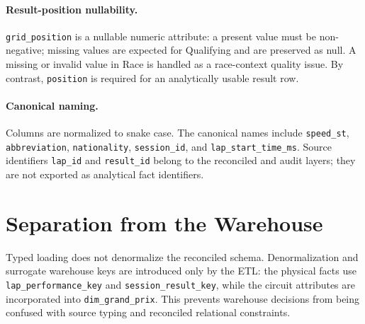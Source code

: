 \documentclass[a4paper,11pt]{article}
\begin{document}
	\paragraph{Result-position nullability.}
	\texttt{grid\_position} is a nullable numeric attribute: a present value must be
	non-negative; missing values are expected for Qualifying and are preserved as null.
	A missing or invalid value in Race is handled as a race-context quality issue.
	By contrast, \texttt{position} is required for an analytically usable result row.

	\paragraph{Canonical naming.}
	Columns are normalized to snake case. The canonical names include
	\texttt{speed\_st}, \texttt{abbreviation}, \texttt{nationality},
	\texttt{session\_id}, and \texttt{lap\_start\_time\_ms}. Source identifiers
	\texttt{lap\_id} and \texttt{result\_id} belong to the reconciled and audit layers;
	they are not exported as analytical fact identifiers.

	\section{Separation from the Warehouse}

	Typed loading does not denormalize the reconciled schema. Denormalization and surrogate
	warehouse keys are introduced only by the ETL: the physical facts use
	\texttt{lap\_performance\_key} and \texttt{session\_result\_key}, while the circuit
	attributes are incorporated into \texttt{dim\_grand\_prix}. This prevents warehouse
	decisions from being confused with source typing and reconciled relational constraints.
	
\end{document}
